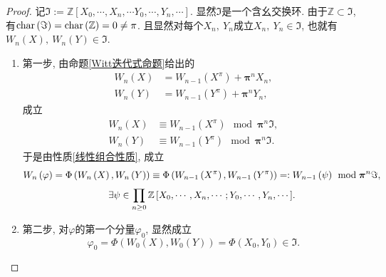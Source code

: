 \documentclass[UTF8, twoside]{ctexart}
\theoremstyle{nonumberplain}
\newtheorem{proof}{\heiti 证明}  %
\theoremstyle{nonumberplain}
\theoremstyle{plain}
\begin{document}
	\begin{proof}
		记$\Im :=\mathbb{Z}\left[ {{X}_{0}},\cdots ,{{X}_{n}},\cdots {{Y}_{0}},\cdots ,{{Y}_{n}},\cdots  \right]$. 
		显然$\Im $是一个含幺交换环. 
		由于$\mathbb{Z}\subset \Im $, 有$\textup{char}\left( \Im  \right)=\textup{char}\left( \mathbb{Z} \right)=0\ne \pi $. 且显然对每个${{X}_{n}},\ {{Y}_{n}}$成立${{X}_{n}},\ {{Y}_{n}}\in \Im $, 也就有${{W}_{n}}\left( X \right),\ {{W}_{n}}\left( Y \right)\in \Im $. 
		\begin{enumerate}
			\item 第一步, 由命题\ref{Witt迭代式命题}给出的
			\begin{align*}
				{{W}_{n}}\left( X \right)&={{W}_{n-1}}\left( {{X}^{\pi }} \right)+{\bm{\pi }^{n}}{{X}_{n}}, \\ 
				{{W}_{n}}\left( Y \right)&={{W}_{n-1}}\left( {{Y}^{\pi }} \right)+{\bm{\pi }^{n}}{{Y}_{n}},
			\end{align*}
			成立
			\begin{align*}
				{{W}_{n}}\left( X \right)&\equiv {{W}_{n-1}}\left( {{X}^{\pi }} \right)\ \bmod {\bm{\pi }^{n}}\Im , \\ 
				{{W}_{n}}\left( Y \right)&\equiv {{W}_{n-1}}\left( {{Y}^{\pi }} \right)\ \bmod {\bm{\pi }^{n}}\Im .
			\end{align*}
			于是由性质\ref{线性组合性质}, 成立
			\begin{gather} 
				{{W}_{n}}\left( \varphi  \right)=\Phi \left( {{W}_{n}}\left( X \right),{{W}_{n}}\left( Y \right) \right)\equiv \Phi \left( {{W}_{n-1}}\left( {{X}^{\pi }} \right),{{W}_{n-1}}\left( {{Y}^{\pi }} \right) \right)=:{{W}_{n-1}}\left( \psi  \right)\ \bmod {\bm{\pi }^{n}}\Im ,\notag \\ 
				\exists \psi \in \prod\limits_{n\ge 0}^{{}}{\mathbb{Z}\left[ {{X}_{0}},\cdots ,{{X}_{n}},\cdots ;{{Y}_{0}},\cdots ,{{Y}_{n}},\cdots  \right]}. \label{202102272208_1}
			\end{gather}
			\vskip 0.3cm
			
			\item 第二步, 对$\varphi$的第一个分量$\varphi_0$, 显然成立
			\[
				{{\varphi }_{0}}=\Phi \left( {{W}_{0}}\left( X \right),{{W}_{0}}\left( Y \right) \right)=\Phi \left( {{X}_{0}},{{Y}_{0}} \right)\in \Im .
			\]
			\vskip 0.3cm
			

\end{enumerate}
\end{proof}
\end{document}
